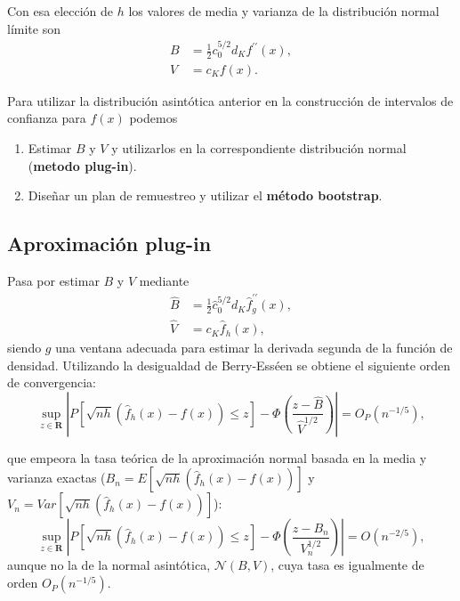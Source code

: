 \documentclass[]{book}
\theoremstyle{definition}
\theoremstyle{definition}
\theoremstyle{definition}
\theoremstyle{remark}
\begin{document}
Con esa elección de \(h\) los valores de media y varianza de la
distribución normal límite son\[\begin{aligned}
B &= \frac{1}{2}c_{0}^{5/2}d_{K}f^{\prime \prime }\left( x \right), \\
V &= c_{K}f\left( x \right).\end{aligned}\]

Para utilizar la distribución asintótica anterior en la construcción de
intervalos de confianza para \(f\left( x \right)\) podemos

\begin{enumerate}
\def\labelenumi{\arabic{enumi}.}
\item
  Estimar \(B\) y \(V\) y utilizarlos en la correspondiente distribución
  normal (\textbf{metodo plug-in}).
\item
  Diseñar un plan de remuestreo y utilizar el \textbf{método bootstrap}.
\end{enumerate}

\subsection{Aproximación plug-in}\label{aproximacion-plug-in}

Pasa por estimar \(B\) y \(V\) mediante\[\begin{aligned}
\hat{B} &= \frac{1}{2}\hat{c}_{0}^{5/2}d_{K}\hat{f}_{g}^{\prime \prime
}\left( x \right), \\
\hat{V} &= c_{K}\hat{f}_{h}\left( x \right),\end{aligned}\]siendo \(g\)
una ventana adecuada para estimar la derivada segunda de la función de
densidad. Utilizando la desigualdad de Berry-Esséen se obtiene el
siguiente orden de
convergencia:\[\sup_{z\in \boldsymbol{R}}\left\vert P\left[ \sqrt{nh}\left( \hat{f}
_{h}\left( x \right) -f\left( x \right) \right) \leq z\right] -\Phi \left( 
\frac{z-\hat{B}}{\hat{V}^{1/2}} \right) \right\vert =O_{P}\left(
n^{-1/5} \right),\]

que empeora la tasa teórica de la aproximación normal basada en la media
y varianza exactas
(\(B_n=E\left[ \sqrt{nh}\left( \hat{f}_{h}\left( x \right) -f\left( x \right) \right) \right]\)
y
\(V_n=Var\left[ \sqrt{nh} \left( \hat{f}_{h}\left( x \right) -f\left( x \right) \right) \right]\)):
\[\sup_{z\in \boldsymbol{R}}\left\vert P\left[ \sqrt{nh}\left( \hat{f}
_{h}\left( x \right) -f\left( x \right) \right) \leq z\right] -\Phi \left( 
\frac{z-B_n}{V_n^{1/2}} \right) \right\vert =O\left( n^{-2/5} \right),\]
aunque no la de la normal asintótica, \(\mathcal{N}\left( B,V \right)\),
cuya tasa es igualmente de orden \(O_{P}\left( n^{-1/5} \right)\).
\end{document}
